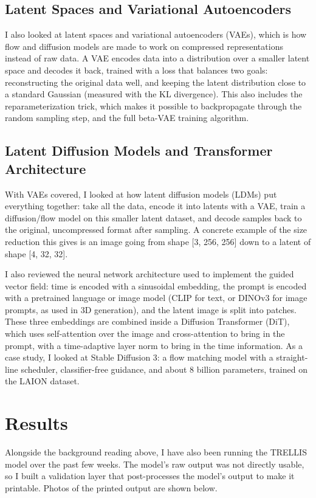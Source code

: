 \documentclass[11pt,a4paper]{article}
\begin{document}
\subsection{Latent Spaces and Variational Autoencoders}
I also looked at latent spaces and variational autoencoders (VAEs), which is how flow and diffusion models are made to work on compressed representations instead of raw data. A VAE encodes data into a distribution over a smaller latent space and decodes it back, trained with a loss that balances two goals: reconstructing the original data well, and keeping the latent distribution close to a standard Gaussian (measured with the KL divergence). This also includes the reparameterization trick, which makes it possible to backpropagate through the random sampling step, and the full beta-VAE training algorithm.

\subsection{Latent Diffusion Models and Transformer Architecture}
With VAEs covered, I looked at how latent diffusion models (LDMs) put everything together: take all the data, encode it into latents with a VAE, train a diffusion/flow model on this smaller latent dataset, and decode samples back to the original, uncompressed format after sampling. A concrete example of the size reduction this gives is an image going from shape [3, 256, 256] down to a latent of shape [4, 32, 32].

I also reviewed the neural network architecture used to implement the guided vector field: time is encoded with a sinusoidal embedding, the prompt is encoded with a pretrained language or image model (CLIP for text, or DINOv3 for image prompts, as used in 3D generation), and the latent image is split into patches. These three embeddings are combined inside a Diffusion Transformer (DiT), which uses self-attention over the image and cross-attention to bring in the prompt, with a time-adaptive layer norm to bring in the time information. As a case study, I looked at Stable Diffusion 3: a flow matching model with a straight-line scheduler, classifier-free guidance, and about 8 billion parameters, trained on the LAION dataset.


\section{Results}
Alongside the background reading above, I have also been running the TRELLIS model over the past few weeks. The model's raw output was not directly usable, so I built a validation layer that post-processes the model's output to make it printable. Photos of the printed output are shown below.
\end{document}
